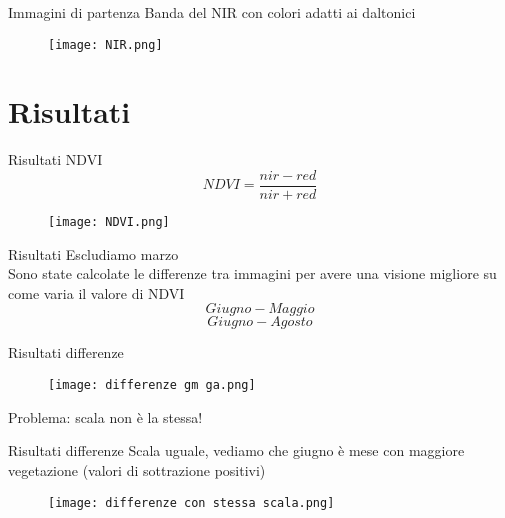 \documentclass{beamer} %
\begin{document}
\begin{frame}{Immagini di partenza}
Banda del NIR con colori adatti ai daltonici
	\begin{figure}
		\centering
		\texttt{[image: NIR.png]}
		\label{fig:enter-label}
	\end{figure}
\end{frame}


\section{Risultati}


\begin{frame}{Risultati NDVI}
	\begin{equation} %
		{NDVI}= \frac{nir-red}{nir+red}
	\end{equation} 
	\begin{figure}
		\centering
		\texttt{[image: NDVI.png]}
		\label{fig:enter-label}
	\end{figure}
\end{frame}


\begin{frame}{Risultati}
Escludiamo marzo \\
\bigskip
Sono state calcolate le differenze tra immagini per avere una visione migliore su come varia il valore di NDVI 
	\begin{equation}
		Giugno - Maggio
	\end{equation}
	\begin{equation}
		Giugno - Agosto
	\end{equation}
\end{frame}


\begin{frame}{Risultati differenze}
	\begin{figure}
		\centering
		\texttt{[image: differenze gm ga.png]}
		\label{fig:enter-label}
	\end{figure}
\centering %
Problema: scala non è la stessa!
\end{frame}


\begin{frame}{Risultati differenze}
Scala uguale, vediamo che giugno è mese con maggiore vegetazione (valori di sottrazione positivi)
	\begin{figure}
		\centering
		\texttt{[image: differenze con stessa scala.png]}
		\label{fig:enter-label}
	\end{figure}
\end{frame}
\end{document}
